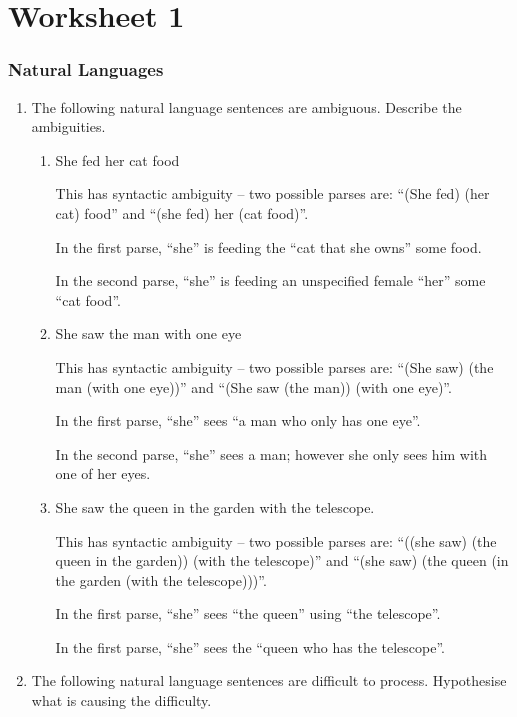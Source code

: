 \documentclass[10pt,\jkfside,a4paper]{article}
\begin{document}
\part{Worksheet 1}

\section{Natural Languages}

\begin{enumerate}

\item The following natural language sentences are ambiguous. Describe the
ambiguities.

\begin{enumerate}

\item She fed her cat food

This has syntactic ambiguity -- two possible parses are: ``(She fed) (her
cat) food'' and ``(she fed) her (cat food)''.

In the first parse, ``she'' is feeding the ``cat that she owns'' some food.

In the second parse, ``she'' is feeding an unspecified female ``her'' some
``cat food''.

\item She saw the man with one eye

This has syntactic ambiguity -- two possible parses are: ``(She saw)
(the man (with one eye))'' and ``(She saw (the man)) (with one eye)''.

In the first parse, ``she'' sees ``a man who only has one eye''.

In the second parse, ``she'' sees a man; however she only sees him with one
of her eyes.

\item She saw the queen in the garden with the telescope.

This has syntactic ambiguity -- two possible parses are: ``((she saw) (the
queen in the garden)) (with the telescope)'' and ``(she saw) (the queen (in
the garden (with the telescope)))''.

In the first parse, ``she'' sees ``the queen'' using ``the telescope''.

In the first parse, ``she'' sees the ``queen who has the telescope''.

\end{enumerate}

\item The following natural language sentences are difficult to process.
Hypothesise what is causing the difficulty.


\end{enumerate}
\end{document}
